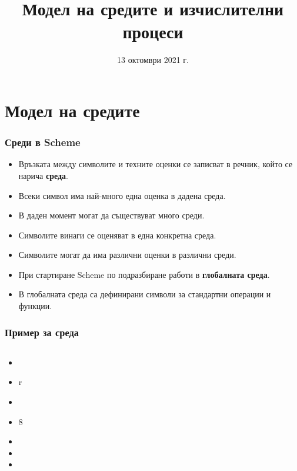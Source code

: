 \documentclass[alsotrans]{beamerswitch}
\title[Среди и процеси]{Модел на средите и изчислителни процеси}
\date{13 октомври 2021 г.}
\begin{document}
\begin{frame}
  \titlepage
\end{frame}

\section{Модел на средите}

\begin{frame}
  \frametitle{Среди в Scheme}

  \begin{itemize}[<+->]
  \item Връзката между символите и техните оценки се записват в речник, който се нарича \textbf{среда}.
  \item Всеки символ има най-много една оценка в дадена среда.
  \item В даден момент могат да съществуват много среди.
  \item Символите винаги се оценяват в една конкретна среда.
  \item \alert{Символите могат да има различни оценки в различни среди.}
  \item При стартиране Scheme по подразбиране работи в \textbf{глобалната среда}.
  \item В глобалната среда са дефинирани символи за стандартни операции и функции.
  \end{itemize}
\end{frame}

\begin{frame}
  \frametitle{Пример за среда}

  \begin{columns}[T,onlytextwidth]
    \begin{column}{.5\textwidth}
      \begin{itemize}[<+->]
      \item {}
      \item \evalstoerr r
      \item {}
      \item {}8
      \item {}
      \item {}
      \item {}
      \end{itemize}
    \end{column}

    \begin{column}{.5\textwidth}
    \end{column}
  \end{columns}
\end{frame}
\end{document}
